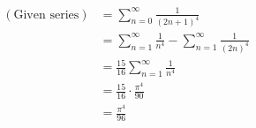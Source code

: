 \item

\begin{align*}
	(\text{Given series})
	&= \sum_{n = 0}^\infty \frac{1}{{(2n + 1)}^4} \\
	&= \sum_{n = 1}^\infty \frac{1}{n^4} - \sum_{n = 1}^\infty \frac{1}{{(2n)}^4} \\
	&= \frac{15}{16} \sum_{n = 1}^\infty \frac{1}{n^4} \\
	&= \frac{15}{16} \cdot \frac{\pi^4}{90} \\
	&= \frac{\pi^4}{96}
\end{align*}
